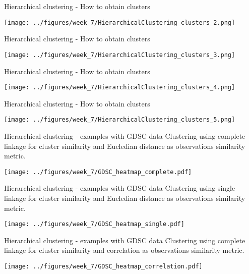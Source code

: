 \documentclass[notes]{beamer}          %
\begin{document}
\begin{frame}{Hierarchical clustering - How to obtain clusters}
\begin{center}
\texttt{[image: ../figures/week\_7/HierarchicalClustering\_clusters\_2.png]}  
\end{center}
\end{frame}

\begin{frame}{Hierarchical clustering - How to obtain clusters}
\begin{center}
\texttt{[image: ../figures/week\_7/HierarchicalClustering\_clusters\_3.png]}  
\end{center}
\end{frame}

\begin{frame}{Hierarchical clustering - How to obtain clusters}
\begin{center}
\texttt{[image: ../figures/week\_7/HierarchicalClustering\_clusters\_4.png]}  
\end{center}
\end{frame}

\begin{frame}{Hierarchical clustering - How to obtain clusters}
\begin{center}
\texttt{[image: ../figures/week\_7/HierarchicalClustering\_clusters\_5.png]}  
\end{center}
\end{frame}

\begin{frame}{Hierarchical clustering - examples with GDSC data}
Clustering using complete linkage for cluster similarity and Eucledian distance as observations similarity metric.
\begin{center}
\texttt{[image: ../figures/week\_7/GDSC\_heatmap\_complete.pdf]}  
\end{center}
\end{frame}

\begin{frame}{Hierarchical clustering - examples with GDSC data}
Clustering using single linkage for cluster similarity and Eucledian distance as observations similarity metric.\begin{center}
\texttt{[image: ../figures/week\_7/GDSC\_heatmap\_single.pdf]}  
\end{center}
\end{frame}

\begin{frame}{Hierarchical clustering - examples with GDSC data}
Clustering using complete linkage for cluster similarity and correlation as observations similarity metric.
\begin{center}
\texttt{[image: ../figures/week\_7/GDSC\_heatmap\_correlation.pdf]}  
\end{center}
\end{frame}
\end{document}

